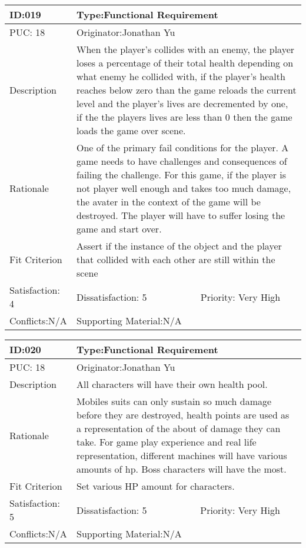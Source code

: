 \documentclass{article}
\begin{document}
	\begin{table}[H]
		\begin{tabular}{|l|l|l|}
			\hline
			ID:019 & \multicolumn{2}{l|}{Type:Functional Requirement} \\ \hline
			PUC: 18 & \multicolumn{2}{l|}{Originator:Jonathan Yu} \\ \hline
			Description & \multicolumn{2}{m{0.85\textwidth}|}{When the player’s collides with an enemy, the player loses a percentage of their total health depending on what enemy he collided with, if the player’s health reaches below zero than the game reloads the current level and the player’s lives are decremented by one, if the the players lives are less than 0 then the game loads the game over scene.} \\ \hline
			Rationale & \multicolumn{2}{m{0.85\textwidth}|}{One of the primary fail conditions for the player. A game needs to have challenges and consequences of failing the challenge. For this game, if the player is not player well enough and takes too much damage, the avater in the context of the game will be destroyed. The player will have to suffer losing the game and start over.} \\ \hline
			Fit Criterion & \multicolumn{2}{m{0.85\textwidth}|}{Assert if the instance of the object and the player that collided with each other are still within the scene} \\ \hline
			Satisfaction: 4 & Dissatisfaction: 5 & Priority: Very High \\ \hline
			Conflicts:N/A & \multicolumn{2}{l|}{Supporting Material:N/A} \\ \hline
		\end{tabular}
	\end{table}




	\begin{table}[H]
		\begin{tabular}{|l|l|l|}
			\hline
			ID:020 & \multicolumn{2}{l|}{Type:Functional Requirement} \\ \hline
			PUC: 18& \multicolumn{2}{l|}{Originator:Jonathan Yu} \\ \hline
			Description & \multicolumn{2}{m{0.85\textwidth}|}{All characters will have their own health pool.}\\\hline
			Rationale & \multicolumn{2}{m{0.85\textwidth}|}{Mobiles suits can only sustain so much damage before they are destroyed, health points are used as a representation of the about of damage  they can take. For game play experience and real life representation, different machines will have various amounts of hp. Boss characters will have the most.} \\ \hline
			Fit Criterion & \multicolumn{2}{m{0.85\textwidth}|}{Set various HP amount for characters.} \\ \hline
			Satisfaction: 5 & Dissatisfaction: 5 & Priority: Very High \\ \hline
			Conflicts:N/A & \multicolumn{2}{l|}{Supporting Material:N/A} \\ \hline
		\end{tabular}
	\end{table}
\end{document}
